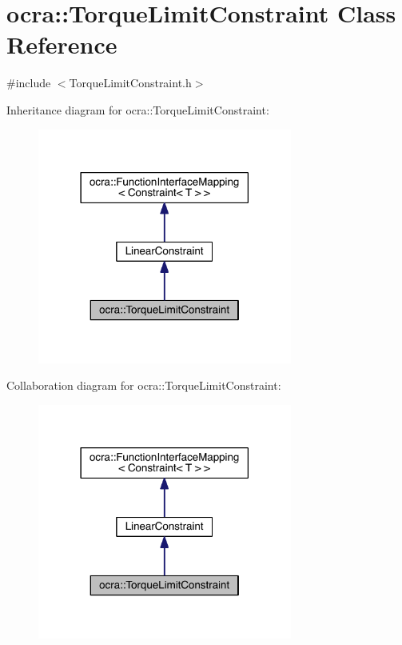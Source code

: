 \hypertarget{classocra_1_1TorqueLimitConstraint}{}\section{ocra\+:\+:Torque\+Limit\+Constraint Class Reference}
\label{classocra_1_1TorqueLimitConstraint}


{\ttfamily \#include $<$Torque\+Limit\+Constraint.\+h$>$}



Inheritance diagram for ocra\+:\+:Torque\+Limit\+Constraint\+:\nopagebreak
\begin{figure}[H]
\begin{center}
\leavevmode
\includegraphics[width=237pt]{d5/dea/classocra_1_1TorqueLimitConstraint__inherit__graph}
\end{center}
\end{figure}


Collaboration diagram for ocra\+:\+:Torque\+Limit\+Constraint\+:\nopagebreak
\begin{figure}[H]
\begin{center}
\leavevmode
\includegraphics[width=237pt]{d5/dd9/classocra_1_1TorqueLimitConstraint__coll__graph}
\end{center}
\end{figure}
